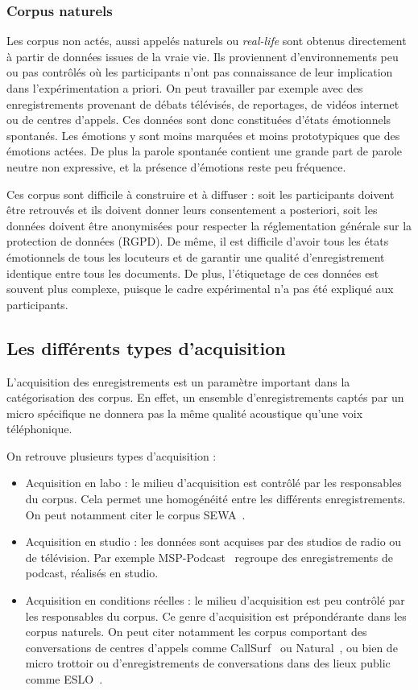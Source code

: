 \subsubsection{Corpus naturels}
Les corpus non actés, aussi appelés naturels ou \textit{real-life} sont obtenus directement à partir de données issues de la vraie vie. Ils proviennent d'environnements peu ou pas contrôlés où les participants n'ont pas connaissance de leur implication dans l'expérimentation a priori. On peut travailler par exemple avec des enregistrements provenant de débats télévisés, de reportages, de vidéos internet ou de centres d'appels. Ces données sont donc constituées d'états émotionnels spontanés. Les émotions y sont moins marquées et moins prototypiques que des émotions actées. De plus la parole spontanée contient une grande part de parole neutre non expressive, et la présence d'émotions reste peu fréquence.

Ces corpus sont difficile à construire et à diffuser : soit les participants doivent être retrouvés et ils doivent donner leurs consentement a posteriori, soit les données doivent être anonymisées pour respecter la réglementation générale sur la protection de données (RGPD). De même, il est difficile d'avoir tous les états émotionnels de tous les locuteurs et de garantir une qualité d'enregistrement identique entre tous les documents.
De plus, l'étiquetage de ces données est souvent plus complexe, puisque le cadre expérimental n'a pas été expliqué aux participants.

\subsection{Les différents types d'acquisition}
L'acquisition des enregistrements est un paramètre important dans la catégorisation des corpus. En effet, un ensemble d'enregistrements captés par un micro spécifique ne donnera pas la même qualité acoustique qu'une voix téléphonique.

On retrouve plusieurs types d'acquisition :
\begin{itemize}
  \item Acquisition en labo : le milieu d'acquisition est contrôlé par les responsables du corpus. Cela permet une homogénéité entre les différents enregistrements. On peut notamment citer le corpus SEWA~\cite{SEWA}.
  \item Acquisition en studio : les données sont acquises par des studios de radio ou de télévision. Par exemple MSP-Podcast~\cite{Lotfian2019} regroupe des enregistrements de podcast, réalisés en studio.
  \item Acquisition en conditions réelles : le milieu d'acquisition est peu contrôlé par les responsables du corpus. Ce genre d'acquisition est prépondérante dans les corpus naturels. On peut citer notamment les corpus comportant des conversations de centres d'appels comme CallSurf~\cite{Garnier2008} ou Natural~\cite{Morrison2007}, ou bien de micro trottoir ou d'enregistrements de conversations dans des lieux public comme ESLO~\cite{Eshkol2011}.
\end{itemize}

